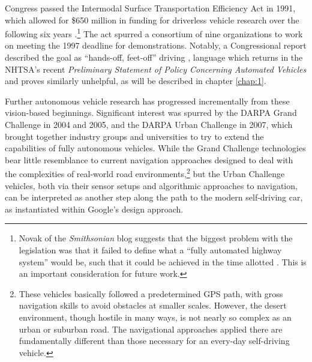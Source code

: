 Congress passed the Intermodal 
Surface Transportation Efficiency Act in 1991, which allowed for \$650 million
in funding for driverless vehicle research over the following six
years
\cite{???-http://www.smithsonianmag.com/history/the-national-automated-highway-system-that-almost-was-63027245/}.\footnote{Novak
of the \emph{Smithsonian} blog suggests that the biggest problem with
the legislation was that it failed to define what a ``fully automated
highway system'' would be, such that it could be achieved in the time
allotted \cite{???-same}. This is an important consideration for
future work.} The act spurred a consortium of nine organizations to
work on meeting the 1997 deadline for demonstrations.
Notably, a Congressional report described the goal as ``hands-off,
feet-off'' driving \cite{???-same}, language which returns in the NHTSA's recent
\emph{Preliminary Statement of Policy Concerning Automated Vehicles}
and proves similarly unhelpful, as will be described in chapter
\ref{chap:1}.


Further autonomous vehicle research has progressed incrementally from
these vision-based beginnings. Significant interest was spurred by the
DARPA Grand Challenge in 2004 and 2005,\cite{???} and the DARPA Urban Challenge
in 2007, which brought together industry groups and universities to
try to extend the capabilities of fully autonomous vehicles. While the
Grand Challenge technologies bear little resemblance to current
navigation approaches designed to deal with the complexities of
real-world road environments,\footnote{These vehicles basically
  followed a predetermined GPS path, with gross navigation skills to
  avoid obstacles at smaller scales. However, the desert environment,
  though hostile in many ways, is not nearly so complex as an urban or
suburban road. The navigational approaches applied there are
fundamentally different than those necessary for an every-day
self-driving vehicle.} but the Urban Challenge
vehicles, both via their sensor setups and algorithmic approaches to
navigation, can be interpreted as another step along the path to the
modern self-driving car, as instantiated within Google's design approach. 

